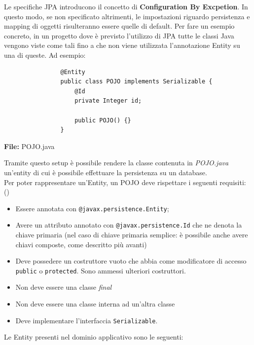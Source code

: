         Le specifiche JPA introducono il concetto di \textbf{Configuration By Excpetion}. In questo modo, se non specificato altrimenti, le impostazioni riguardo persistenza e mapping di oggetti risulteranno essere quelle di default. Per fare un esempio concreto, in un progetto dove è previsto l'utilizzo di JPA tutte le classi Java vengono viste come tali fino a che non viene utilizzata l'annotazione Entity su una di queste. Ad esempio:

        \begin{code}
            \begin{verbatim}
                @Entity
                public class POJO implements Serializable {
                    @Id 
                    private Integer id;

                    public POJO() {}
                }
            \end{verbatim}
            \caption{\textbf{File:} POJO.java}
        \end{code}
    
        Tramite questo setup è possibile rendere la classe contenuta in \textit{POJO.java} un'entity di cui è possibile effettuare la persistenza su un database.\\

        Per poter rappresentare un'Entity, un POJO deve rispettare i seguenti requisiti: (\cite{jee7})

        \begin{itemize}
            \item Essere annotata con \texttt{@javax.persistence.Entity};
            \item Avere un attributo annotato con \texttt{@javax.persistence.Id} che ne denota la chiave primaria (nel caso di chiave primaria semplice: è possibile anche avere chiavi composte, come descritto più avanti)
            \item Deve possedere un costruttore vuoto che abbia come modificatore di accesso \texttt{public} o \texttt{protected}. Sono ammessi ulteriori costruttori.
            \item Non deve essere una classe \textit{final}
            \item Non deve essere una classe interna ad un'altra classe
            \item Deve implementare l'interfaccia \texttt{Serializable}.
        \end{itemize}

        Le Entity presenti nel dominio applicativo sono le seguenti:

